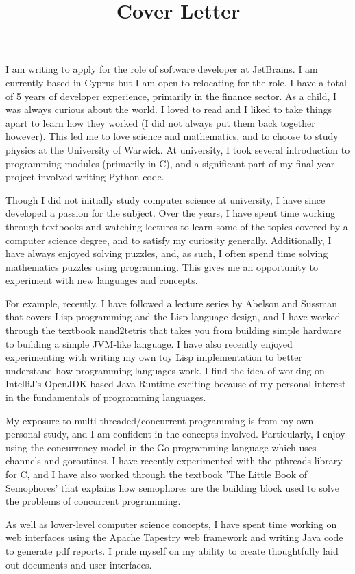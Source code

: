 \documentclass[11pt]{article}
\title{Cover Letter}
\date{}
\begin{document}
I am writing to apply for the role of software developer at JetBrains. I am currently based in Cyprus but I am open to relocating for the role. I have a total of 5 years of developer experience, primarily in the finance sector. As a child, I was always curious about the world. I loved to read and I liked to take things apart to learn how they worked (I did not always put them back together however). This led me to love science and mathematics, and to choose to study physics at the University of Warwick. At university, I took several introduction to programming modules (primarily in C), and a significant part of my final year project involved writing Python code.

Though I did not initially study computer science at university, I have since developed a passion for the subject. Over the years, I have spent time working through textbooks and watching lectures to learn some of the topics covered by a computer science degree, and to satisfy my curiosity generally. Additionally, I have always enjoyed solving puzzles, and, as such, I often spend time solving mathematics puzzles using programming. This gives me an opportunity to experiment with new languages and concepts.

For example, recently, I have followed a lecture series by Abelson and Sussman that covers Lisp programming and the Lisp language design, and I have worked through the textbook nand2tetris that takes you from building simple hardware to building a simple JVM-like language. I have also recently enjoyed experimenting with writing my own toy Lisp implementation to better understand how programming languages work. I find the idea of working on IntelliJ's OpenJDK based Java Runtime exciting because of my personal interest in the fundamentals of programming languages.

My exposure to multi-threaded/concurrent programming is from my own personal study, and I am confident in the concepts involved. Particularly, I enjoy using the concurrency model in the Go programming language which uses channels and goroutines. I have recently experimented with the pthreads library for C, and I have also worked through the textbook 'The Little Book of Semophores' that explains how semophores are the building block used to solve the problems of concurrent programming. 

As well as lower-level computer science concepts, I have spent time working on web interfaces using the Apache Tapestry web framework and writing Java code to generate pdf reports. I pride myself on my ability to create thoughtfully laid out documents and user interfaces.
\end{document}
